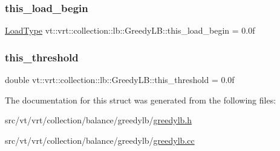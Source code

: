 \subsubsection{\texorpdfstring{this\+\_\+load\+\_\+begin}{this\_load\_begin}}
{\footnotesize\ttfamily \hyperlink{structvt_1_1vrt_1_1collection_1_1lb_1_1_base_l_b_a215e22b9f12678303f49615ae3be05cc}{Load\+Type} vt\+::vrt\+::collection\+::lb\+::\+Greedy\+L\+B\+::this\+\_\+load\+\_\+begin = 0.\+0f\hspace{0.3cm}{\ttfamily [private]}}

\mbox{\label{structvt_1_1vrt_1_1collection_1_1lb_1_1_greedy_l_b_afd457b0829f152767e1aa5b07d7652ef}} 
\subsubsection{\texorpdfstring{this\+\_\+threshold}{this\_threshold}}
{\footnotesize\ttfamily double vt\+::vrt\+::collection\+::lb\+::\+Greedy\+L\+B\+::this\+\_\+threshold = 0.\+0f\hspace{0.3cm}{\ttfamily [private]}}



The documentation for this struct was generated from the following files\+:\begin{DoxyCompactItemize}
\item 
src/vt/vrt/collection/balance/greedylb/\hyperlink{greedylb_8h}{greedylb.\+h}\item 
src/vt/vrt/collection/balance/greedylb/\hyperlink{greedylb_8cc}{greedylb.\+cc}\end{DoxyCompactItemize}
